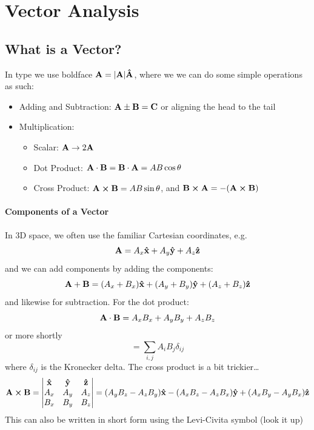 \documentclass[../main.tex]{subfiles}
\begin{document}
\pagestyle{fancy}

\section{Vector Analysis}
\barh 

\subsection{What is a Vector?}

In type we use boldface $\vb A = \abs{\vb A} \vu A$, where we we can do some simple operations as such:

\begin{itemize}
    \item Adding and Subtraction: $\vb A \pm \vb B = \vb C$ or aligning the head to the tail
    \item Multiplication:
    \begin{itemize}
        \item Scalar: $\vb A \to 2 \vb A$
        \item Dot Product: $\vb A \cdot \vb B = \vb B \cdot \vb A = AB \cos\theta$
        \item Cross Product: $\vb A \cross \vb B = AB \sin\theta$, and $\vb B \cross \vb A = -(\vb A \cross \vb B)$
    \end{itemize}
\end{itemize}

\paragraph*{Components of a Vector}

In 3D space, we often use the familiar Cartesian coordinates, e.g.
\[\vb A = A_x \vu x + A_y \vu y + A_z \vu z\]
and we can add components by adding the components:
\[\vb A + \vb B = (A_x + B_x) \vu x + (A_y + B_y) \vu y + (A_z + B_z) \vu z\]
and likewise for subtraction. For the dot product:
\[\vb A \cdot \vb B = A_x B_x + A_y B_y + A_z B_z\]
or more shortly
\[= \sum_{i,j} A_i B_j \delta_{ij}\]
where $\delta_{ij}$ is the Kronecker delta. The cross product is a bit trickier\dots
\[\vb A \cross \vb B = \begin{vmatrix}
    \vu x & \vu y & \vu z \\
    A_x & A_y & A_z \\
    B_x & B_y & B_z
\end{vmatrix}
= (A_y B_z - A_z B_y) \vu x - (A_x B_z - A_z B_x) \vu y + (A_x B_y - A_y B_x) \vu z\]
This can also be written in short form using the Levi-Civita symbol (look it up)
\end{document}
